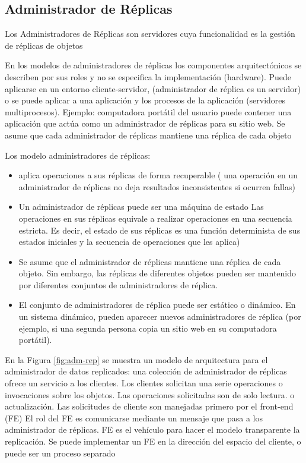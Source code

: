  \subsection{Administrador de Réplicas}
 Los Administradores de Réplicas son servidores cuya funcionalidad es la gestión de réplicas de objetos   

 En los  modelos de  administradores de réplicas  los componentes arquitectónicos se describen por sus roles y no se especifica la implementación (hardware). Puede aplicarse en un entorno cliente-servidor, (administrador de réplica es un servidor) o se puede aplicar a una aplicación y los procesos de la aplicación (servidores multiprocesos).  Ejemplo: computadora portátil del usuario   puede contener una aplicación que actúa como un administrador de réplicas para su sitio web.
 Se asume que cada administrador de réplicas mantiene una réplica de cada objeto 
 
 Los modelo administradores  de réplicas:
 \begin{itemize}
 	\item  aplica operaciones a sus réplicas de forma recuperable ( una operación en un administrador de réplicas no deja resultados inconsistentes si ocurren fallas) 
 	\item  Un administrador de réplicas puede ser una máquina de estado    \cite{Lamport1978} \cite{Schneider1990} Las operaciones en sus réplicas equivale a realizar operaciones en una secuencia estricta. Es decir, el estado de sus réplicas es una función determinista de sus estados iniciales y la secuencia de operaciones que les aplica)
	 \item 	Se asume que el administrador de réplicas mantiene una réplica de cada objeto. Sin embargo, las réplicas de diferentes objetos pueden ser mantenido por diferentes conjuntos de administradores de réplica. 
 	\item El conjunto de administradores de réplica puede ser estático o dinámico. En un sistema dinámico, pueden aparecer nuevos administradores de réplica (por ejemplo, si una segunda persona  copia un sitio web en su computadora portátil).
 		
 \end{itemize}


En la Figura \ref{fig:adm-rep} se muestra un modelo de arquitectura para el administrador de datos replicados: una colección de administrador de réplicas ofrece un servicio a los clientes. Los clientes  solicitan una serie  operaciones o invocaciones sobre  los objetos.  Las operaciones solicitadas son de solo lectura. o actualización. 
 Las solicitudes de  cliente son manejadas primero por el front-end (FE)
 El rol del FE es comunicarse mediante un mensaje que pasa a los  administrador de réplicas.
 FE es el  vehículo para hacer el modelo transparente la replicación.
 Se puede implementar un FE en la dirección del espacio del cliente, o puede ser un proceso separado 
 
